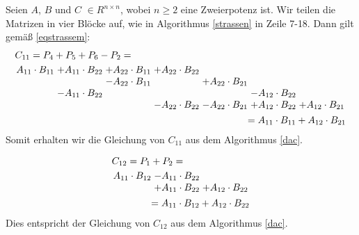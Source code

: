 \begin{bew}
    Seien $A$, $B$ und $C$ $\in R^{n \times n}$, wobei $n \geq 2$ eine Zweierpotenz ist. Wir teilen die Matrizen in vier Blöcke auf, wie in Algorithmus \ref{strassen} in Zeile 7-18. Dann gilt gemäß \ref{eqstrassem}:
    \begin{equation*}
        \begin{multlined}
            C_{11} = P_{4} + P_{5} + P_{6} - P_{2} = \\
            \arraycolsep=1.4pt
            \begin{array}{ccccccc}
                A_{11} \cdot B_{11} & + A_{11} \cdot B_{22} & + A_{22} \cdot B_{11} & + A_{22} \cdot B_{22} &&& \\
                && - A_{22} \cdot B_{11} && + A_{22} \cdot B_{21}&& \\
                & - A_{11} \cdot B_{22} &&&& - A_{12} \cdot B_{22}& \\
                &&& - A_{22} \cdot B_{22} & - A_{22} \cdot B_{21} & + A_{12} \cdot B_{22} & + A_{12} \cdot B_{21} \\
            \end{array} \\
            = A_{11} \cdot B_{11} + A_{12} \cdot B_{21}
        \end{multlined}
    \end{equation*}
    Somit erhalten wir die Gleichung von $C_{11}$ aus dem Algorithmus \ref{dac}.
    
    \begin{equation*}
        \begin{multlined}
            C_{12} = P_{1} + P_{2} = \\
            \arraycolsep=1.4pt
            \begin{array}{ccc}
                A_{11} \cdot B_{12} & - A_{11} \cdot B_{22} &\\
                & + A_{11} \cdot B_{22} & + A_{12} \cdot B_{22} \\
            \end{array} \\
            = A_{11} \cdot B_{12} + A_{12} \cdot B_{22}
        \end{multlined}
    \end{equation*}
    Dies entspricht der Gleichung von $C_{12}$ aus dem Algorithmus \ref{dac}.
    

\end{bew}
